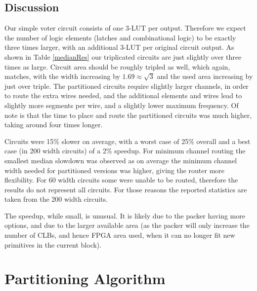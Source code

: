 \documentclass[12pt,final,oneside]{dwThesis} %
\begin{document}
   \section{Discussion}
   Our simple voter circuit consists of one 3-\ac{LUT} per output. Therefore we expect the number of logic elements (latches and combinational logic) to be exactly three times larger, with an additional 3-\ac{LUT} per original circuit output. As shown in Table \ref{medianRes} our triplicated circuits are just slightly over three times as large. Circuit area should be roughly tripled as well, which again, matches, with the width increasing by $1.69 \approx \sqrt{3}$ and the used area increasing by just over triple. The partitioned circuits require slightly larger channels, in order to route the extra wires needed, and the additional elements and wires lead to slightly more segments per wire, and a slightly lower maximum frequency. Of note is that the time to place and route the partitioned circuits was much higher, taking around four times longer.

   Circuits were 15\% slower on average, with a worst case of 25\% overall and a best case (in 200 width circuits) of a 2\% speedup. For minimum channel routing the smallest median slowdown was observed as on average the minimum channel width needed for partitioned versions was higher, giving the router more flexibility. For 60 width circuits some were unable to be routed, therefore the results do not represent all circuits. For those reasons the reported statistics are taken from the 200 width circuits.

   The speedup, while small, is unusual. It is likely due to the packer having more options, and due to the larger available area (as the packer will only increase the number of \acp{CLB}, and hence \ac{FPGA} area used, when it can no longer fit new primitives in the current block).


   \chapter{Partitioning Algorithm}
\end{document}
